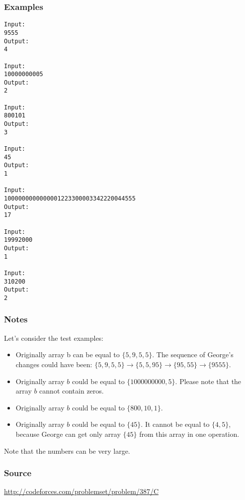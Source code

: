 \subsubsection*{Examples}
\begin{verbatim}
Input:
9555
Output:
4

Input:
10000000005
Output:
2

Input:
800101
Output:
3

Input:
45
Output:
1

Input:
1000000000000001223300003342220044555
Output:
17

Input:
19992000
Output:
1

Input:
310200
Output:
2
\end{verbatim}

\subsubsection*{Notes}
Let's consider the test examples:
\begin{itemize}
    \item Originally array b can be equal to $\{5,9,5,5\}$.
        The sequence of George's changes could have been:
        $\{5,9,5,5\}\rightarrow\{5,5,95\}\rightarrow\{95,55\}
        \rightarrow\{9555\}$.
    \item Originally array $b$ could be equal to $\{1000000000,5\}$.
        Please note that the array $b$ cannot contain zeros.
    \item Originally array $b$ could be equal to $\{800,10,1\}$.
    \item Originally array $b$ could be equal to $\{45\}$.
        It cannot be equal to $\{4,5\}$,
        because George can get only array $\{45\}$ from this array
        in one operation.
\end{itemize}
Note that the numbers can be very large.

\subsubsection*{Source} \url{http://codeforces.com/problemset/problem/387/C}
